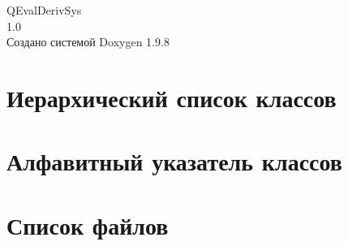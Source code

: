 \documentclass[twoside]{book}
\newcommand{\+}{\discretionary{\mbox{\scriptsize$\hookleftarrow$}}{}{}}
\newcommand{\clearemptydoublepage}{%
    \newpage{\pagestyle{empty}\cleardoublepage}%
  }
\begin{document}
  \raggedbottom
    \hypersetup{pageanchor=false,
                bookmarksnumbered=true,
                pdfencoding=unicode
               }
  \begin{titlepage}
  \vspace*{7cm}
  \begin{center}%
  {\Large QEval\+Deriv\+Sys}\\
  [1ex]\large 1.\+0 \\
  \vspace*{1cm}
  {\large Создано системой Doxygen 1.9.8}\\
  \end{center}
  \end{titlepage}
  \clearemptydoublepage
  \tableofcontents
  \clearemptydoublepage
  \hypersetup{pageanchor=true}


\chapter{Иерархический список классов}

\chapter{Алфавитный указатель классов}

\chapter{Список файлов}

\end{document}
